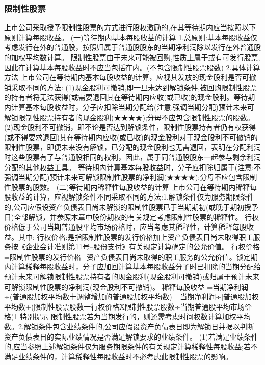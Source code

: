 \documentclass[UTF8,12pt]{ctexart}
\numberwithin{equation}{section} %
\numberwithin{figure}{section}
\numberwithin{table}{section}
\begin{document}
	\subsubsection{限制性股票}
	上市公司采取授予限制性股票的方式进行股权激励的,在其等待期内应当按照以下原则计算每股收益。
	(一)等待期内基本每股收益的计算
	1.总原则:基本每股收益仅考虑发行在外的普通股，按照归属于普通股股东的当期净利润除以发行在外普通股的加权平均数计算。
	限制性股票由于未来可能被回购,性质上属于或有可发行股票,因此在计算基本每股收益时不应当包括在内。(不包含限制性股票股数)
	2.具体计算方法
	上市公司在等待期内基本每股收益的计算，应视其发放的现金股利是否可撤销采取不同的方法:
	(1)现金股利可撤销,即一旦未达到解锁条件,被回购限制性股票的持有者将无法获得(或需要退回其在等待期内应收(或已收)的现金股利。等待期内计算基本每股收益时，分子应扣除当期分配给(注意:强调当期分配)预计未来可解锁限制性股票持有者的现金股利(★★★★);分母不应包含限制性股票的股数。
	(2)现金股利不可撤销，即不论是否达到解锁条件，限制性股票持有者仍有权获得(或不得要求退回)其在等待期内应收(或已收)的现金股利对于现金股利不可撤销的限制性股票，即便未来没有解锁，已分配的现金股利也无需退回，表明在分配利润时这些股票有了与普通股相同的权利，因此，属于同普通股股东一起参与剩余利润分配的其他权益工具。
	等待期内计算基本每股收益时，分子应扣除归属于(注意:不强调当期分配)预计未来可解锁限制性股票的净利润(★★★★);分母不应包含限制性股票的股数。
	(二)等待期内稀释性每股收益的计算
	上市公司在等待期内稀释每股收益的计算，应视解锁条件不同采取不同的方法:1.解锁条件仅为服务期限条件的,公司应假设资产负债表日尚未解锁的限制性股票已于当期期初(或晚于期初授予日)全部解锁，并参照本章中股份期权的有关规定考虑限制性股票的稀释性。
	行权价格低于公司当期普通股平均市场价格时，应当考虑其稀释性，计算稀释每股收益。其中:
	行权价格:是指限制性股票的发行价格加上资产负债表日尚未取得职工服务按《企业会计准则第11号--股份支付》有关规定计算确定的公允价值。
	行权价格=限制性股票的发行价格+资产负债表日尚未取得的职工服务的公允价值。锁定期内计算稀释每股收益时，分子应加回计算基本每股收益分子时已扣除的当期分配给预计未来可解锁限制性股票持有者的现金股利(现金股利可撤销)或归属于预计未来可解锁限制性股票的净利润(现金股利不可撤销)。
	稀释每股收益
	=当期净利润÷(普通股加权平均数十调整增加的普通股加权平均数)
	=当期净利润÷[普通股加权平均数+(限制性股票股数一行权价格X限制性股票股数÷当期普通股平均市场价格)1
	特别提示
	限制性股票若为当期发行的，则还需考虑时间权数计算加权平均数。2.解锁条件包含业绩条件的,公司应假设资产负债表日即为解锁日并据以判断资产负债表日的实际业绩情况是否满足解锁要求的业绩条件。
	(1)若满足业绩条件的,应当参照上述解锁条件仅为服务期限条件的有关规定计算稀释性每股收益;若不满足业绩条件的，计算稀释性每股收益时不必考虑此限制性股票的影响。
\end{document}
